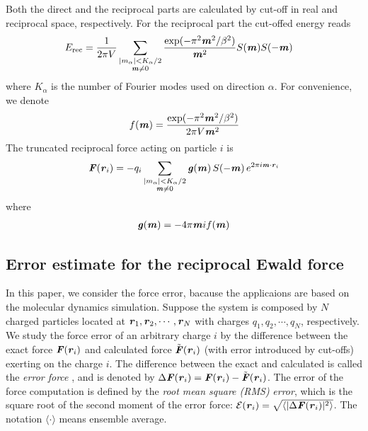 \documentclass[aps,pre,preprint]{revtex4-1}
\renewcommand{\v}[1]{\textbf{\textit{#1}}}
\begin{document}
Both the direct and the reciprocal parts are calculated by cut-off in
real and reciprocal space, respectively. For the reciprocal part the
cut-offed energy reads
\begin{align}
  E_{\textrm{rec}} & =
  \frac1{2\pi V}
  \sum_{
    \begin{subarray}{c}
      \vert m_\alpha\vert < K_\alpha/2\\
      \v m\neq 0
    \end{subarray}}
  \frac{\exp(-\pi^2\v m^2 / \beta^2)}{\v m^2} S(\v m) S(-\v m)   
\end{align}
where $K_\alpha$ is the number of Fourier modes used on direction
$\alpha$. For convenience, we denote
\begin{align}
  f(\v m) = \frac{\exp(-\pi^2 \v m^2 / \beta^2)}{2\pi V \v m^2}
\end{align}
The truncated reciprocal force acting on particle $i$ is
\begin{align}
  \v F(\v r_i) = - 
  q_i 
  \sum_{
    \begin{subarray}{c}
      \vert m_\alpha\vert < K_\alpha/2\\
      \v m\neq 0
    \end{subarray}}
  \v g(\v m) \,
  S(-\v m)\,
  e^{2\pi i\v m\cdot\v r_i}
\end{align}
where
\begin{align}
  \v g(\v m) = -4 \pi \v m i f(\v m)
\end{align}



\subsection{Error estimate for the reciprocal Ewald force}

In this paper, we consider the force error, bacause the applicaions
are based on the molecular dynamics simulation.  Suppose the system is
composed by $N$ charged particles located at $\v r_1, \v r_2, \cdots,
\v r_N$ with charges $q_1, q_2, \cdots, q_N$, respectively.  We study
the force error of an arbitrary charge $i$ by the difference between
the exact force $\v F(\v r_i)$ and calculated force $\tilde{\v F}(\v
r_i)$ (with error introduced by cut-offs) exerting on the charge $i$.
The difference between the exact and calculated is called the
\emph{error force} \cite{short}, and is denoted by $\Delta \v F(\v r_i)
= \v F(\v r_i) - \tilde{\v F}(\v r_i)$.  The error of the force
computation is defined by the \emph{root mean square (RMS)}
\emph{error}, which is the square root of the second moment of the
error force: $\mathcal E(\v r_i) = \sqrt{\langle\vert\Delta\v F(\v
  r_i)\vert^2\rangle}$.  The notation $\langle\cdot\rangle$ means
ensemble average.
\end{document}

